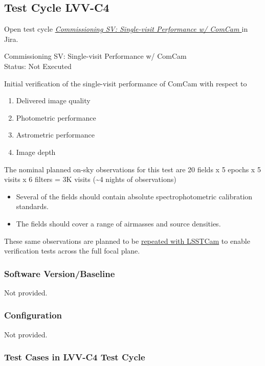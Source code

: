 \documentclass[DM,lsstdraft,STR,toc]{lsstdoc}
\providecommand{\tightlist}{
  \setlength{\itemsep}{0pt}\setlength{\parskip}{0pt}}
\begin{document}
\subsection{Test Cycle LVV-C4 }

Open test cycle {\it \href{https://jira.lsstcorp.org/secure/Tests.jspa#/testrun/LVV-C4}{Commissioning SV: Single-visit Performance w/ ComCam
}} in Jira.

Commissioning SV: Single-visit Performance w/ ComCam
\\
Status: Not Executed

Initial verification of the single-visit performance of ComCam with
respect to

\begin{enumerate}
\tightlist
\item
  Delivered image quality
\item
  Photometric performance
\item
  Astrometric performance
\item
  Image depth
\end{enumerate}

The nominal planned on-sky observations for this test are 20 fields x 5
epochs x 5 visits x 6 filters = 3K visits (\textasciitilde{}4 nights of
observations)

\begin{itemize}
\tightlist
\item
  Several of the fields should contain absolute spectrophotometric
  calibration standards.
\item
  The fields should cover a range of airmasses and source densities.
\end{itemize}

These same observations are planned to be
\href{https://jira.lsstcorp.org/secure/Tests.jspa\#/testCycle/LVV-C6}{repeated
with LSSTCam} to enable verification tests across the full focal plane.


\subsubsection{Software Version/Baseline}
Not provided.

\subsubsection{Configuration}
Not provided.

\subsubsection{Test Cases in LVV-C4 Test Cycle}
\end{document}
